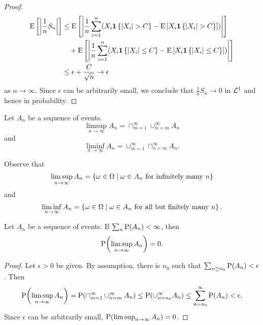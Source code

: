 \begin{proof}
\begin{equation*}
        \begin{split}
            \E\sbrc{\abs{\frac{1}{n}S_n}} &\leq \E\sbrc{\abs{\frac{1}{n}\sum_{i=1}^n\pth{X_i\one\set{\abs{X_i}>C} - \E\sbrc{X_i\one\set{\abs{X_i}>C}}}}} \\
            &\quad + \E\sbrc{\abs{\frac{1}{n}\sum_{i=1}^n\pth{X_i\one\set{\abs{X_i}\leq C} - \E\sbrc{X_i\one\set{\abs{X_i}\leq C}}}}} \\ 
            &\leq \epsilon + \frac{C}{\sqrt{n}}\to\epsilon
        \end{split}
    \end{equation*}
    as $n\to\infty$. Since $\epsilon$ can be arbitrarily small, we conclude 
    that $\frac{1}{n}S_n\to 0$ in $\L^1$ and hence in probability. 
\end{proof}

\begin{definition}
    Let $A_n$ be a sequence of events. 
    \begin{equation*}
        \limsup_{n\to\infty} A_n = \cap_{m=1}^\infty\cup_{n=m}^\infty A_n
    \end{equation*}
    and 
    \begin{equation*}
        \liminf_{n\to\infty} A_n = \cup_{m=1}^\infty\cap_{n=m}^\infty A_n. 
    \end{equation*}
\end{definition}
\begin{remark}
    Observe that 
    \begin{equation*}
        \limsup_{n\to\infty} A_n 
        = \Set{\omega\in\Omega}{\omega\in A_n\text{ for infinitely many $n$}} 
    \end{equation*}
    and 
    \begin{equation*}
        \liminf_{n\to\infty}A_n 
        = \Set{\omega\in\Omega}{\omega\in A_n\text{ for all but finitely many $n$}}. 
    \end{equation*}
\end{remark}

\begin{theorem}
    Let $A_n$ be a sequence of events. If $\sum_n \P(A_n)<\infty$, then 
    \begin{equation*}
        \P\pth{\limsup_{n\to\infty}A_n} = 0.
    \end{equation*}
\end{theorem}
\begin{proof}
    Let $\epsilon>0$ be given. By assumption, there is $n_0$ such that 
    $\sum_{n\geq n_0}\P(A_n)<\epsilon$. Then 
    \begin{equation*}
        \P\pth{\limsup_{n\to\infty}A_n} = \P(\cap_{m=1}^\infty\cup_{n=m}^\infty A_n) 
        \leq \P(\cup_{n=n_0}^\infty A_n)\leq \sum_{n=n_0}^\infty \P(A_n)<\epsilon. 
    \end{equation*}
    Since $\epsilon$ can be arbitrarily small, $\P\pth{\limsup_{n\to\infty}A_n} = 0$. 
\end{proof}

